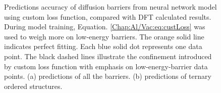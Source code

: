 \begingroup
\begin{figure}[!ht]
  \centering
\caption[Predictions accuracy of diffusion barriers from neural network model using custom loss function, compared with DFT calculated results.]{Predictions accuracy of diffusion barriers from neural network model using custom loss function, compared with DFT calculated results. During model training, Equation. \ref{Chap:Al/Vac:eq:custLoss} was used to weigh more on low-energy barriers. The orange solid line indicates perfect fitting. Each blue solid dot represents one data point. The black dashed lines illustrate the confinement introduced by custom loss function with emphasis on low-energy-barrier data points. (a) predictions of all the barriers. (b) predictions of ternary ordered structures.}
\label{Chap:Al/Vac:fig:fitting_all_weighted}
\end{figure}
\endgroup